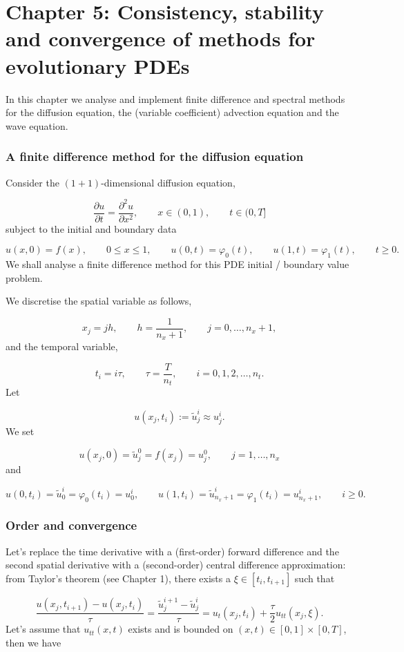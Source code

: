 \documentclass[12pt,a4paper]{article}
\begin{document}
\section{Chapter 5: Consistency, stability and convergence of methods for evolutionary PDEs}
In this chapter we analyse and implement finite difference and spectral methods for the diffusion equation, the (variable coefficient) advection equation and the wave equation.   

\subsubsection{A finite difference method for the diffusion equation}
Consider the $(1+1)$-dimensional diffusion equation,

\[
\frac{\partial u}{\partial t}=\frac{\partial^2 u}{\partial x^2}, \qquad x \in (0, 1),\qquad t \in (0, T]
\]
subject to the initial and boundary data

\[
u(x,0) = f(x), \qquad 0 \leq x \leq 1, \qquad u(0,t) = \varphi_0(t), \qquad u(1,t) = \varphi_1(t), \qquad t \geq 0.
\]
We shall analyse a finite difference method for this PDE initial / boundary value problem.

We discretise the spatial variable as follows,

\[
x_j = j h, \qquad h = \frac{1}{n_x + 1}, \qquad j = 0, \ldots, n_x + 1,
\]
and the temporal variable,

\[
t_i = i\tau, \qquad \tau = \frac{T}{n_t}, \qquad i = 0, 1, 2, \ldots, n_t.
\]
Let 

\[
u(x_j, t_i) := \tilde{u}^i_j \approx u^{i}_j.
\]
We set

\[
u(x_j, 0) = \tilde{u}^0_j =  f(x_j) =  u^{0}_j, \qquad j = 1, \ldots, n_x
\]
and

\[
u(0,t_i)  = \tilde{u}^i_0 = \varphi_0(t_i) =  u^i_0, \qquad u(1,t_i) =  \tilde{u}^i_{n_x + 1} = \varphi_1(t_i) =  u^i_{n_x +1}, \qquad i \geq 0.
\]
\subsubsection{Order and convergence}
Let's replace the time derivative with a (first-order) forward difference and the second spatial derivative with a (second-order) central difference approximation: from Taylor's theorem (see Chapter 1), there exists a $\xi \in [t_i, t_{i+1}]$ such that

\[
\frac{u(x_j,t_{i+1}) - u(x_j,t_{i})}{\tau} =\frac{\tilde{u}^{i+1}_j - \tilde{u}^i_j}{\tau} = u_t(x_j,t_i) + \frac{\tau}{2}u_{tt}(x_j,\xi).
\]
Let's assume that $u_{tt}(x,t)$ exists and is bounded on $(x,t) \in [0,1]\times[0,T]$, then we have
\end{document}
